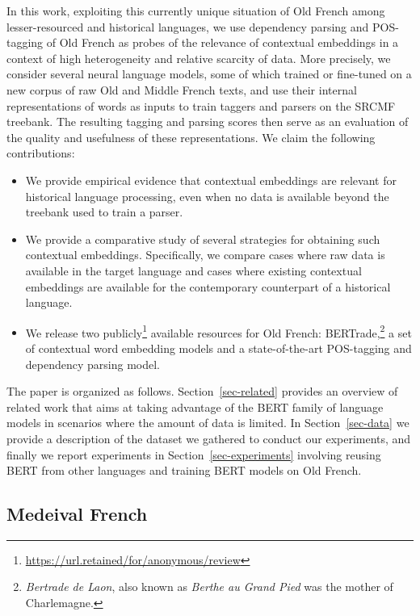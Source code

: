 In this work, exploiting this currently unique situation of Old French among lesser-resourced and historical languages, we use dependency parsing and POS-tagging of Old French as probes of the relevance of contextual embeddings in a context of high heterogeneity and relative scarcity of data.
More precisely, we consider several neural language models, some of which trained or fine-tuned on a new corpus of raw Old and Middle French texts, and use their internal representations of words as inputs to train taggers and parsers on the SRCMF treebank. The resulting tagging and parsing scores then serve as an evaluation of the quality and usefulness of these representations.
We claim the following contributions:
%
\begin{itemize}
    \item We provide empirical evidence that contextual embeddings are relevant for historical language processing, even when no data is available beyond the treebank used to train a parser.
    \item We provide a comparative study of several strategies for obtaining such contextual embeddings. Specifically, we compare cases where raw data is available in the target language and cases where existing contextual embeddings are available for the contemporary counterpart of a historical language.
    \item We release two publicly\footnote{\url{https://url.retained/for/anonymous/review}} available resources for Old French: BERTrade,\footnote{\emph{Bertrade de Laon}, also known as \emph{Berthe au Grand Pied} was the mother of Charlemagne.} a set of contextual word embedding models and a state-of-the-art POS-tagging and dependency parsing model.
\end{itemize}

The paper is organized as follows. Section~\ref{sec-related} provides an overview of related work that aims at taking advantage of the BERT family of language models in scenarios where the amount of data is limited. In Section~\ref{sec-data} we provide a description of the dataset we gathered to conduct our experiments, and finally we report experiments in Section~\ref{sec-experiments} involving reusing BERT from other languages and training BERT models on Old French.

\subsection{Medeival French}

